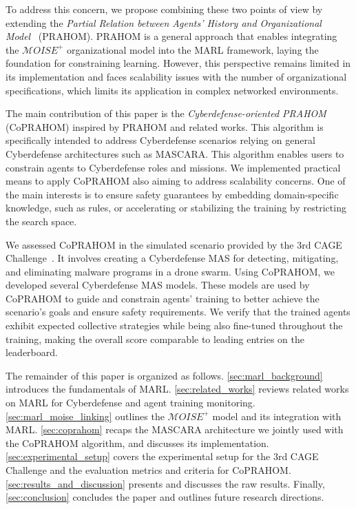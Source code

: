 To address this concern, we propose combining these two points of view by extending the \textit{Partial Relation between Agents' History and Organizational Model}~\cite{soule2024} (PRAHOM). PRAHOM is a general approach that enables integrating the $\mathcal{M}OISE^+$ organizational model into the MARL framework, laying the foundation for constraining learning. However, this perspective remains limited in its implementation and faces scalability issues with the number of organizational specifications, which limits its application in complex networked environments.

The main contribution of this paper is the \textit{Cyberdefense-oriented PRAHOM} (CoPRAHOM) inspired by PRAHOM and related works. This algorithm is specifically intended to address Cyberdefense scenarios relying on general Cyberdefense architectures such as MASCARA. This algorithm enables users to constrain agents to Cyberdefense roles and missions. We implemented practical means to apply CoPRAHOM also aiming to address scalability concerns. One of the main interests is to ensure safety guarantees by embedding domain-specific knowledge, such as rules, or accelerating or stabilizing the training by restricting the search space.

We assessed CoPRAHOM in the simulated scenario provided by the 3rd CAGE Challenge~\cite{cage_challenge_3_announcement}. It involves creating a Cyberdefense MAS for detecting, mitigating, and eliminating malware programs in a drone swarm. Using CoPRAHOM, we developed several Cyberdefense MAS models. These models are used by CoPRAHOM to guide and constrain agents' training to better achieve the scenario's goals and ensure safety requirements. We verify that the trained agents exhibit expected collective strategies while being also fine-tuned throughout the training, making the overall score comparable to leading entries on the leaderboard.

The remainder of this paper is organized as follows. \autoref{sec:marl_background} introduces the fundamentals of MARL. \autoref{sec:related_works} reviews related works on MARL for Cyberdefense and agent training monitoring. \autoref{sec:marl_moise_linking} outlines the $\mathcal{M}OISE^+$ model and its integration with MARL. \autoref{sec:coprahom} recaps the MASCARA architecture we jointly used with the CoPRAHOM algorithm, and discusses its implementation. \autoref{sec:experimental_setup} covers the experimental setup for the 3rd CAGE Challenge and the evaluation metrics and criteria for CoPRAHOM. \autoref{sec:results_and_discussion} presents and discusses the raw results. Finally, \autoref{sec:conclusion} concludes the paper and outlines future research directions.


